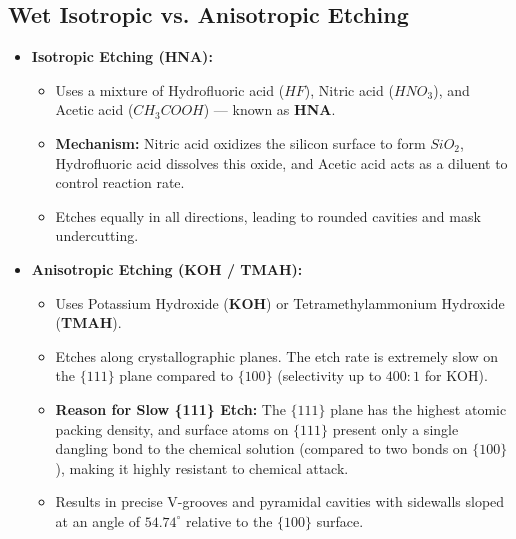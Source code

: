 \documentclass[12pt,a4paper]{article}
\begin{document}
\subsection{Wet Isotropic vs. Anisotropic Etching}
\begin{itemize}[leftmargin=*, itemsep=4pt]
  \item \textbf{Isotropic Etching (HNA):}
    \begin{itemize}[leftmargin=*, itemsep=2.5pt]
      \item Uses a mixture of Hydrofluoric acid ($HF$), Nitric acid ($HNO_3$), and Acetic acid ($CH_3COOH$) --- known as \textbf{HNA}.
      \item \textbf{Mechanism:} Nitric acid oxidizes the silicon surface to form $SiO_2$, Hydrofluoric acid dissolves this oxide, and Acetic acid acts as a diluent to control reaction rate.
      \item Etches equally in all directions, leading to rounded cavities and mask undercutting.
    \end{itemize}
  \item \textbf{Anisotropic Etching (KOH / TMAH):}
    \begin{itemize}[leftmargin=*, itemsep=2.5pt]
      \item Uses Potassium Hydroxide (\textbf{KOH}) or Tetramethylammonium Hydroxide (\textbf{TMAH}).
      \item Etches along crystallographic planes. The etch rate is extremely slow on the $\{111\}$ plane compared to $\{100\}$ (selectivity up to $400:1$ for KOH).
      \item \textbf{Reason for Slow \{111\} Etch:} The $\{111\}$ plane has the highest atomic packing density, and surface atoms on $\{111\}$ present only a single dangling bond to the chemical solution (compared to two bonds on $\{100\}$), making it highly resistant to chemical attack.
      \item Results in precise V-grooves and pyramidal cavities with sidewalls sloped at an angle of $54.74^{\circ}$ relative to the $\{100\}$ surface.
    \end{itemize}
\end{itemize}
\end{document}

